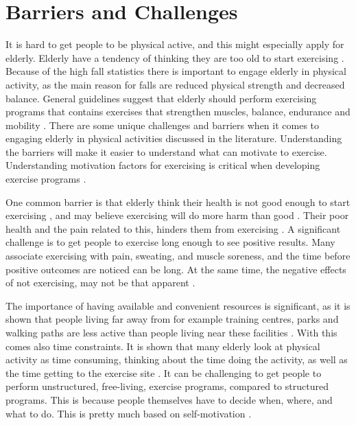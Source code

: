 \section{Barriers and Challenges}
\label{sec:barriers}
It is hard to get people to be physical active, and this might especially apply for elderly. Elderly have a tendency of thinking they are too old to start exercising \cite{schutzer}. Because of the high fall statistics there is important to engage elderly in physical activity, as the main reason for falls are reduced physical strength and decreased balance. General guidelines suggest that elderly should perform exercising programs that contains exercises that strengthen muscles, balance, endurance and mobility \cite{gruppetrening-trheim}. There are some unique challenges and barriers when it comes to engaging elderly in physical activities discussed in the literature. Understanding the barriers will make it easier to understand what can motivate to exercise. Understanding motivation factors for exercising is critical when developing exercise programs \cite{chao}.


One common barrier is that elderly think their health is not good enough to start exercising \cite{schutzer}, and may believe exercising will do more harm than good \cite{chao}. Their poor health and the pain related to this, hinders them from exercising \cite{schutzer}. A significant challenge is to get people to exercise long enough to see positive results. Many associate exercising with pain, sweating, and muscle soreness, and the time before positive outcomes are noticed can be long. At the same time, the negative effects of not exercising, may not be that apparent \cite{chao}. 

The importance of having available and convenient resources is significant, as it is shown that people living far away from for example training centres, parks and walking paths are less active than people living near these facilities \cite{schutzer}. With this comes also time constraints. It is shown that many elderly look at physical activity as time consuming, thinking about the time doing the activity, as well as the time getting to the exercise site \cite{schutzer} \cite{chao}. It can be challenging to get people to perform unstructured, free-living, exercise programs, compared to structured programs. This is because people themselves have to decide when, where, and what to do. This is pretty much based on self-motivation \cite{chao}.  

